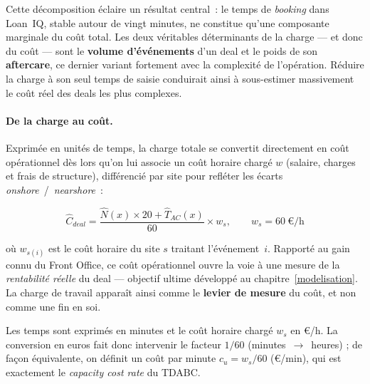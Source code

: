 \medskip

Cette décomposition éclaire un résultat central~: le temps de \textit{booking} dans Loan~IQ, stable autour de vingt minutes, ne constitue qu'une composante marginale du coût total. Les deux véritables déterminants de la charge --- et donc du coût --- sont le \textbf{volume d'événements} d'un deal et le poids de son \textbf{aftercare}, ce dernier variant fortement avec la complexité de l'opération. Réduire la charge à son seul temps de saisie conduirait ainsi à sous-estimer massivement le coût réel des deals les plus complexes.

\paragraph{De la charge au coût.}
Exprimée en unités de temps, la charge totale se convertit directement en coût opérationnel dès lors qu'on lui associe un coût horaire chargé $w$ (salaire, charges et frais de structure), différencié par site pour refléter les écarts \textit{onshore}~/~\textit{nearshore}~:

\begin{equation}
\hat{C}_{deal} = \frac{\hat{N}(x)\times 20 + \hat{T}_{AC}(x)}{60}\times w_s,
\qquad w_s = 60\ \text{€/h}
\end{equation}

\noindent où $w_{s(i)}$ est le coût horaire du site $s$ traitant l'événement~$i$. Rapporté au gain connu du Front Office, ce coût opérationnel ouvre la voie à une mesure de la \textit{rentabilité réelle} du deal --- objectif ultime développé au chapitre~\ref{modelisation}. La charge de travail apparaît ainsi comme le \textbf{levier de mesure} du coût, et non comme une fin en soi.

Les temps sont exprimés en minutes et le coût horaire chargé $w_s$ en €/h. La conversion en euros fait donc intervenir le facteur $1/60$
(minutes~$\rightarrow$~heures) ; de façon équivalente, on définit un coût par
minute $c_u = w_s/60$ (€/min), qui est exactement le \emph{capacity cost rate}
du TDABC.


